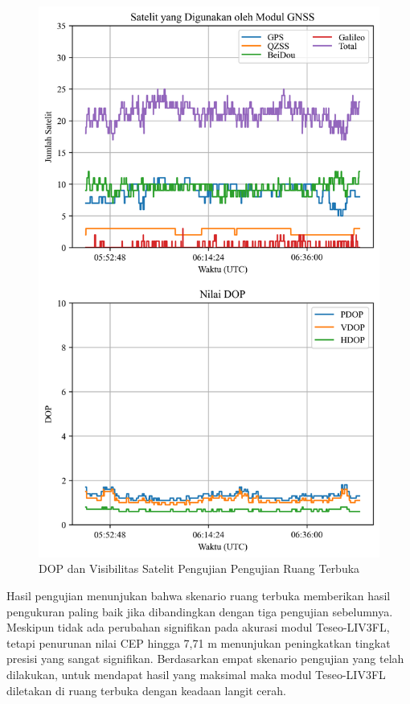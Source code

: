 \begin{figure}[H]
	\centering
	\includegraphics[width=12cm]{contents/chapter-4/4-skenario-outdoor/sats_dop.png}
	\caption{DOP dan Visibilitas Satelit Pengujian Pengujian Ruang Terbuka}
	\label{Fig: outdoor-dop_sats}
\end{figure}

Hasil pengujian menunjukan bahwa skenario ruang terbuka memberikan hasil pengukuran paling baik jika dibandingkan dengan tiga pengujian sebelumnya. Meskipun tidak ada perubahan signifikan pada akurasi modul Teseo-LIV3FL, tetapi penurunan nilai CEP hingga 7,71 m menunjukan peningkatkan tingkat presisi yang sangat signifikan. Berdasarkan empat skenario pengujian yang telah dilakukan, untuk mendapat hasil yang maksimal maka modul Teseo-LIV3FL diletakan di ruang terbuka dengan keadaan langit cerah.


